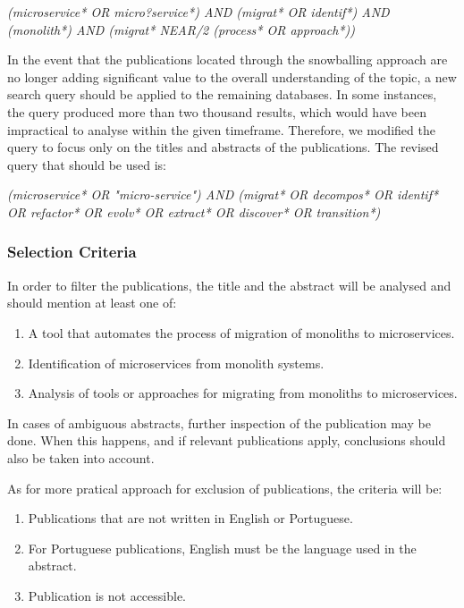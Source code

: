 \documentclass[conference]{IEEEtran}
\begin{document}
\begin{center}
  \emph{(microservice* OR micro?service*) AND (migrat* OR identif*) AND
  (monolith*) AND (migrat* NEAR/2 (process* OR approach*))}
\end{center}

In the event that the publications located through the snowballing approach are
no longer adding significant value to the overall understanding of the topic, a
new search query should be applied to the remaining databases. In some
instances, the query produced more than two thousand results, which would have
been impractical to analyse within the given timeframe. Therefore, we modified
the query to focus only on the titles and abstracts of the publications. The
revised query that should be used is:

\begin{center}
  \emph{(microservice* OR "micro-service") AND (migrat* OR decompos* OR
  identif* OR refactor* OR evolv* OR extract* OR discover* OR transition*)}
\end{center}

\subsubsection{Selection Criteria} \label{sub:selection-criteria}

In order to filter the publications, the title and the abstract will be
analysed and should mention at least one of:

\begin{enumerate}[{IC}1.]
  \item A tool that automates the process of migration of monoliths to
    microservices.
  \item Identification of microservices from monolith systems.
  \item Analysis of tools or approaches for migrating from monoliths to
    microservices.
\end{enumerate}

In cases of ambiguous abstracts, further inspection of the publication may be
done. When this happens, and if relevant publications apply, conclusions should
also be taken into account.

As for more pratical approach for exclusion of publications, the criteria will
be:

\begin{enumerate}[{EC}1.]
  \item Publications that are not written in English or Portuguese.
  \item For Portuguese publications, English must be the language used in the
    abstract.
  \item Publication is not accessible.
\end{enumerate}
\end{document}
